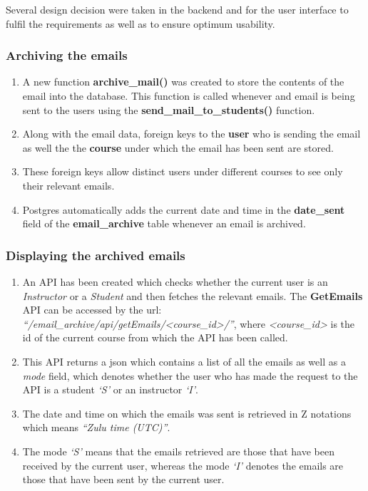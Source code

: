 Several design decision were taken in the backend and for the user interface to fulfil the requirements as well as to ensure optimum usability.

\subsubsection*{Archiving the emails}

\begin{enumerate}
	\item A new function \textbf{archive\_mail()} was created to store the contents of the email into the database. This function is called whenever and email is being sent to the users using the \textbf{send\_mail\_to\_students()} function.
	\item Along with the email data, foreign keys to the \textbf{user} who is sending the email as well the the \textbf{course} under which the email has been sent are stored.
	\item These foreign keys allow distinct users under different courses to see only their relevant emails.
	\item Postgres automatically adds the current date and time in the \textbf{date\_sent} field of the \textbf{email\_archive} table whenever an email is archived.
\end{enumerate}


\subsubsection*{Displaying the archived emails}

\begin{enumerate}
	\item An API has been created which checks whether the current user is an \textit{Instructor} or a \textit{Student} and then fetches the relevant emails. The \textbf{GetEmails} API can be accessed by the url:
	\textit{``/email\_archive/api/getEmails/\textless course\_id\textgreater/''}, where \textit{\textless course\_id\textgreater} is the id of the current course from which the API has been called.
	\item This API returns a json which contains a list of all the emails as well as a \textit{mode} field, which denotes whether the user who has made the request to the API is a student \textit{`S'} or an instructor \textit{`I'}.
	\item The date and time on which the emails was sent is retrieved in Z notations which means \textit{``Zulu time (UTC)''}.
	\item The mode \textit{`S'} means that the emails retrieved are those that have been received by the current user, whereas the mode \textit{`I'} denotes the emails are those that have been sent by the current user.
\end{enumerate}

